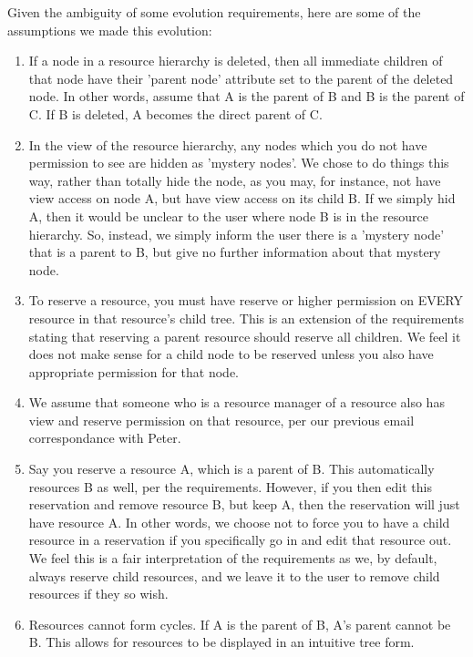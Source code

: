 \documentclass[12pt]{article}
\begin{document}
Given the ambiguity of some evolution requirements, here are some of the assumptions we made this evolution:
\begin{enumerate}
    \item If a node in a resource hierarchy is deleted, then all immediate children of that node have their 'parent node' attribute set to the parent of the deleted node. In other words, assume that A is the parent of B and B is the parent of C. If B is deleted, A becomes the direct parent of C.
    \item In the view of the resource hierarchy, any nodes which you do not have permission to see are hidden as 'mystery nodes'. We chose to do things this way, rather than totally hide the node, as you may, for instance, not have view access on node A, but have view access on its child B. If we simply hid A, then it would be unclear to the user where node B is in the resource hierarchy. So, instead, we simply inform the user there is a 'mystery node' that is a parent to B, but give no further information about that mystery node. 
    \item To reserve a resource, you must have reserve or higher permission on EVERY resource in that resource's child tree. This is an extension of the requirements stating that reserving a parent resource should reserve all children. We feel it does not make sense for a child node to be reserved unless you also have appropriate permission for that node. 
    \item We assume that someone who is a resource manager of a resource also has view and reserve permission on that resource, per our previous email correspondance with Peter. 
    \item Say you reserve a resource A, which is a parent of B. This automatically resources B as well, per the requirements. However, if you then edit this reservation and remove resource B, but keep A, then the reservation will just have resource A. In other words, we choose not to force you to have a child resource in a reservation if you specifically go in and edit that resource out. We feel this is a fair interpretation of the requirements as we, by default, always reserve child resources, and we leave it to the user to remove child resources if they so wish. 
    \item Resources cannot form cycles. If A is the parent of B, A's parent cannot be B. This allows for resources to be displayed in an intuitive tree form. 
\end{enumerate}
\end{document}

